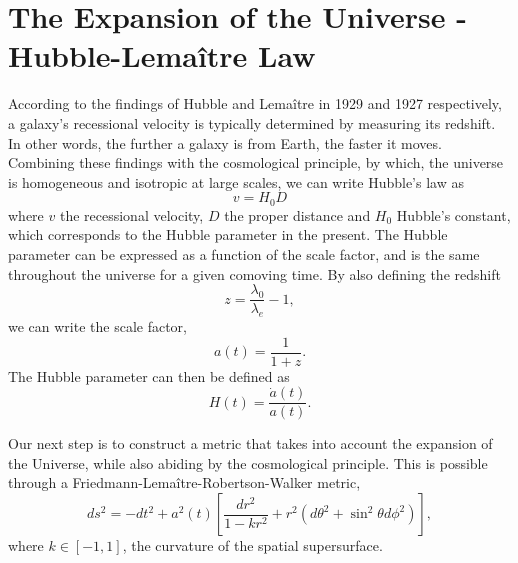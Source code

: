 \documentclass{book}
\begin{document}
	\section{The Expansion of the Universe - Hubble-Lemaître Law}
	According to the findings of Hubble and Lemaître in 1929 and 1927 respectively, a galaxy's recessional velocity is typically determined by measuring its redshift. In other words, the further a galaxy is from Earth, the faster it moves. Combining these findings with the cosmological principle, by which, the universe is homogeneous and isotropic at large scales, we can write Hubble's law as
	\begin{equation}
		\label{Hubble_Law}
		v=H_0 D
	\end{equation}
	where $v$ the recessional velocity, $D$ the proper distance and $H_0$ Hubble's constant, which corresponds to the Hubble parameter in the present. The Hubble parameter can be expressed as a function of the scale factor, and is the same throughout the universe for a given comoving time. By also defining the redshift
	\begin{equation}
		\label{redshift_definition}
		z=\frac{\lambda_0}{\lambda_e}-1,
	\end{equation}
	we can write the scale factor,
	\begin{equation}
		\label{scale_factor_definition}
		a(t)=\frac{1}{1+z}.
	\end{equation}
	The Hubble parameter can then be defined as
	\begin{equation}
		\label{Hubble_Parameter_Definition}
		H(t)=\frac{\dot a(t)}{a(t)}.
	\end{equation}
	
	Our next step is to construct a metric that takes into account the expansion of the Universe, while also abiding by the cosmological principle. This is possible through a Friedmann-Lemaître-Robertson-Walker metric,
	\begin{equation}
		\label{FLRB_basic_metric}
		ds^2=-dt^2+a^2(t)\left[\frac{dr^2}{1-kr^2} + r^2 \left(d\theta^2+\sin^2\theta d\phi^2\right)\right],
	\end{equation}
	where $k\in [-1,1]$, the curvature of the spatial supersurface. 
	
\end{document}

